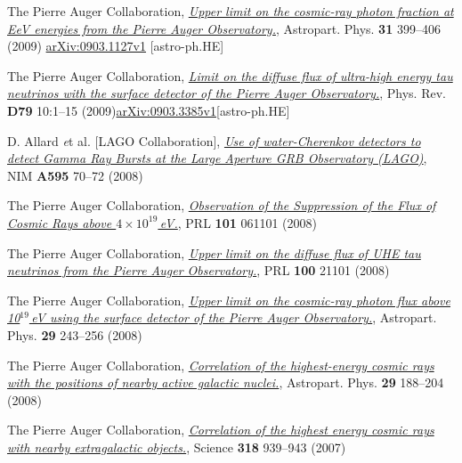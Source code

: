\begin{etaremune}
\item {}The Pierre Auger Collaboration,
\href{http://dx.doi.org/10.1016/j.astropartphys.2009.04.003}{\emph{Upper limit
on the cosmic-ray photon fraction at EeV energies from the Pierre Auger
Observatory.}}, Astropart. Phys. {\bf 31} 399--406 (2009) 
\href{http://arxiv.org/abs/0903.1127/}{arXiv:0903.1127v1} [astro-ph.HE]

\item {}The Pierre Auger Collaboration,
\href{http://dx.doi.org/10.1103/PhysRevD.79.102001}{\emph{Limit on the diffuse
flux of ultra-high energy tau neutrinos with the surface detector of the Pierre
Auger Observatory.}}, Phys. Rev. {\bf D79} 10:1--15
(2009)\href{http://arxiv.org/abs/0903.3385/}{arXiv:0903.3385v1}[astro-ph.HE]

\item {}D. Allard {\emph et al.} [LAGO Collaboration],
\href{http://dx.doi.org/10.1016/j.nima.2008.07.041}{\emph{Use of
water-Cherenkov detectors to detect Gamma Ray Bursts at the Large Aperture GRB
Observatory (LAGO)}}, NIM {\bf A595} 70--72 (2008)

\item {}The Pierre Auger Collaboration,
\href{http://dx.doi.org/10.1103/PhysRevLett.101.061101}{\emph{Observation of
the Suppression of the Flux of Cosmic Rays above $4\times10^{19}$\,eV.}}, PRL
{\bf 101} 061101 (2008)

\item {}The Pierre Auger Collaboration,
\href{http://dx.doi.org/10.1103/PhysRevLett.100.211101}{\emph{Upper limit on
the diffuse flux of UHE tau neutrinos from the Pierre Auger Observatory.}}, PRL
{\bf 100} 21101 (2008)

\item {}The Pierre Auger Collaboration,
\href{http://dx.doi.org/10.1016/j.astropartphys.2008.01.003}{\emph{Upper limit
on the cosmic-ray photon flux above 10$^{19}$\,eV using the surface detector of
the Pierre Auger Observatory.}}, Astropart. Phys. {\bf 29} 243--256 (2008)

\item {}The Pierre Auger Collaboration,
\href{http://dx.doi.org/10.1016/j.astropartphys.2008.01.002}{\emph{Correlation
of the highest-energy cosmic rays with the positions of nearby active galactic
nuclei.}}, Astropart. Phys. {\bf 29} 188--204 (2008)

\item {}The Pierre Auger Collaboration,
\href{http://dx.doi.org/10.1126/science.1151124}{\emph{Correlation of the
highest energy cosmic rays with nearby extragalactic objects.}}, Science {\bf
318} 939--943 (2007)


\end{etaremune}
